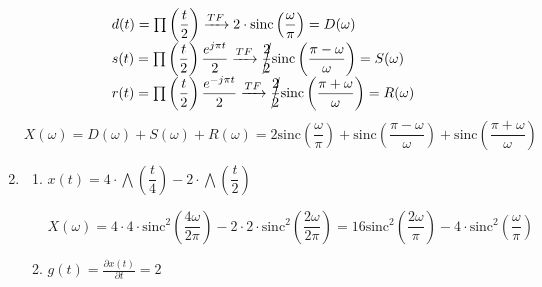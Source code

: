 \begin{enumerate}[label=\color{red}\textbf{\arabic*)}]
     \[
    \begin{array}{l}
        d(t)=\prod\left( \dfrac{t}{2} \right) \xrightarrow{TF} 2\cdot \text{sinc}\left( \dfrac{\omega}{\pi} \right) =D(\omega)\\
        s(t)=\prod\left( \dfrac{t}{2} \right) \dfrac{e^{j\pi t} }{2}\xrightarrow{TF}\cancel{\dfrac{2}{2}} \text{sinc}\left( \dfrac{\pi-\omega}{\omega} \right) =S(\omega)\\
        r(t)=\prod\left( \dfrac{t}{2} \right) \dfrac{e^{-j\pi t}}{2}\xrightarrow{TF}\cancel{\dfrac{2}{2}} \text{sinc}\left( \dfrac{\pi+\omega}{\omega} \right) =R(\omega)
    \end{array}
    \] 
    $X(\omega)=D(\omega)+S(\omega)+R(\omega)=2\text{sinc}\left( \dfrac{\omega}{\pi} \right) +\text{sinc}\left( \dfrac{\pi-\omega}{\omega} \right) +\text{sinc}\left( \dfrac{\pi+\omega}{\omega} \right) $
\item {}
    \begin{center}
    \end{center}
    \begin{enumerate}[label=Forma \arabic*:]
        \item $x(t)=4\cdot \bigwedge\left( \dfrac{t}{4} \right) -2\cdot \bigwedge\left( \dfrac{t}{2} \right) $ 

            \[
            X(\omega)=4\cdot 4\cdot \text{sinc}^2\left( \dfrac{4\omega}{2\pi} \right) -2\cdot 2\cdot \text{sinc}^2\left( \dfrac{2\omega}{2\pi} \right) =16\text{sinc}^2\left( \dfrac{2\omega}{\pi} \right) -4\cdot \text{sinc}^2\left( \dfrac{\omega}{\pi} \right) 
            \] 
        \item $g(t)=\frac{\partial x(t)}{\partial t} =2$
    \end{enumerate}
\end{enumerate}

